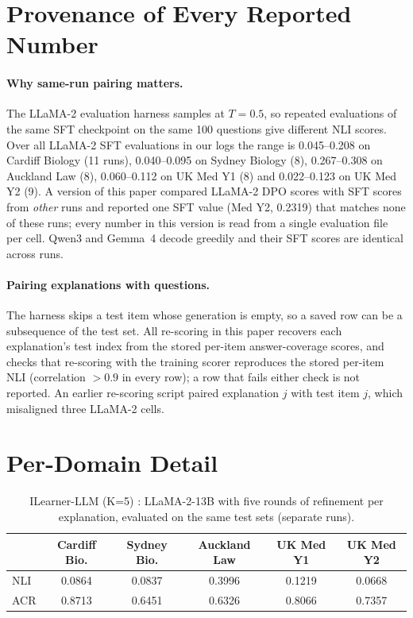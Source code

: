 \appendix

\section{Provenance of Every Reported Number}
\label{sec:provenance}



\paragraph{Why same-run pairing matters.} The LLaMA-2 evaluation harness samples at $T{=}0.5$, so repeated evaluations of the same SFT checkpoint on the same 100 questions give different NLI scores. Over all LLaMA-2 SFT evaluations in our logs the range is 0.045--0.208 on Cardiff Biology (11 runs), 0.040--0.095 on Sydney Biology (8), 0.267--0.308 on Auckland Law (8), 0.060--0.112 on UK Med Y1 (8) and 0.022--0.123 on UK Med Y2 (9). A version of this paper compared LLaMA-2 DPO scores with SFT scores from \emph{other} runs and reported one SFT value (Med Y2, 0.2319) that matches none of these runs; every number in this version is read from a single evaluation file per cell. Qwen3 and Gemma~4 decode greedily and their SFT scores are identical across runs.

\paragraph{Pairing explanations with questions.} The harness skips a test item whose generation is empty, so a saved row can be a subsequence of the test set. All re-scoring in this paper recovers each explanation's test index from the stored per-item answer-coverage scores, and checks that re-scoring with the training scorer reproduces the stored per-item NLI (correlation $>0.9$ in every row); a row that fails either check is not reported. An earlier re-scoring script paired explanation $j$ with test item $j$, which misaligned three LLaMA-2 cells.

\section{Per-Domain Detail}
\label{sec:per_domain_appendix}



\begin{table}[h]
\centering
\small
\caption{ILearner-LLM (K=5) \citep{bao2025exploring}: LLaMA-2-13B with five rounds of refinement per explanation, evaluated on the same test sets (separate runs).}
\label{tab:ilearner}
\begin{tabular}{lccccc}
\toprule
 & Cardiff Bio. & Sydney Bio. & Auckland Law & UK Med Y1 & UK Med Y2 \\
\midrule
NLI & 0.0864 & 0.0837 & 0.3996 & 0.1219 & 0.0668 \\
ACR & 0.8713 & 0.6451 & 0.6326 & 0.8066 & 0.7357 \\
\bottomrule
\end{tabular}
\end{table}

